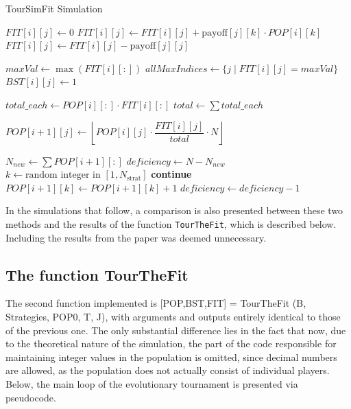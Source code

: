 \documentclass[12pt]{article}
\begin{document}
\begin{algorithm}
\caption{TourSimFit Simulation}
\begin{algorithmic}[1]
        \STATE $FIT[i][j] \gets 0$
            \STATE $FIT[i][j] \gets FIT[i][j] + \text{payoff}[j][k] \cdot POP[i][k]$
        \ENDFOR
        \STATE $FIT[i][j] \gets FIT[i][j] - \text{payoff}[j][j]$
    \ENDFOR

    \STATE $maxVal \gets \max(FIT[i][:])$
    \STATE $allMaxIndices \gets \{j \mid FIT[i][j] = maxVal\}$
        \STATE $BST[i][j] \gets 1$
    \ENDFOR

    \STATE $total\_each \gets POP[i][:] \cdot FIT[i][:]$ 
    \STATE $total \gets \sum total\_each$

        \STATE $POP[i+1][j] \gets \left\lfloor POP[i][j] \cdot \dfrac{FIT[i][j]}{total} \cdot N \right\rfloor$
    \ENDFOR

        \STATE $N_{new} \gets \sum POP[i+1][:]$
        \STATE $deficiency \gets N - N_{new}$
            \STATE $k \gets \text{random integer in } [1, N_{\text{strat}}]$
                \STATE \textbf{continue}
            \ENDIF
            \STATE $POP[i+1][k] \gets POP[i+1][k] + 1$
            \STATE $deficiency \gets deficiency - 1$
        \ENDWHILE
    \ENDIF
\ENDFOR
\end{algorithmic}
\end{algorithm}

In the simulations that follow, a comparison is also presented between these two methods and the results of the function \texttt{TourTheFit}, which is described below. Including the results from the paper was deemed unnecessary.


\subsection{The function TourTheFit}
The second function implemented is [POP,BST,FIT]\- =\- TourTheFit\- (B,\- Strategies,\- POP0,\- T,\- J), with arguments and outputs entirely identical to those of the previous one. The only substantial difference lies in the fact that now, due to the theoretical nature of the simulation, the part of the code responsible for maintaining integer values in the population is omitted, since decimal numbers are allowed, as the population does not actually consist of individual players. Below, the main loop of the evolutionary tournament is presented via pseudocode.
\end{document}
